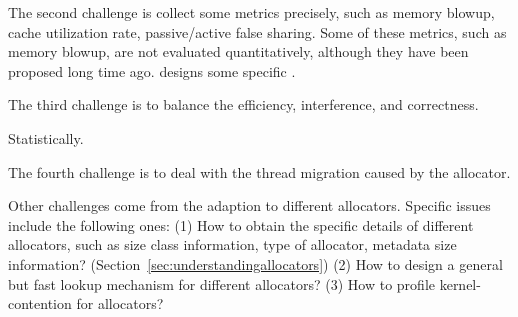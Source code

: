 The second challenge is collect some metrics precisely, such as memory blowup, cache utilization rate, passive/active false sharing. Some of these metrics, such as memory blowup, are not evaluated quantitatively, although they have been proposed long time ago. \MP{} designs some specific . 

The third challenge is to balance the efficiency, interference, and correctness. 

Statistically. 

The fourth challenge is to deal with the thread migration caused by the allocator. 

 

Other challenges come from the adaption to different allocators. Specific issues include the following ones: (1) How to obtain the specific details of different allocators, such as size class information, type of allocator, metadata size information? (Section~\ref{sec:understandingallocators}) (2) How to design a general but fast lookup mechanism for different allocators? (3) How to profile kernel-contention for allocators?








